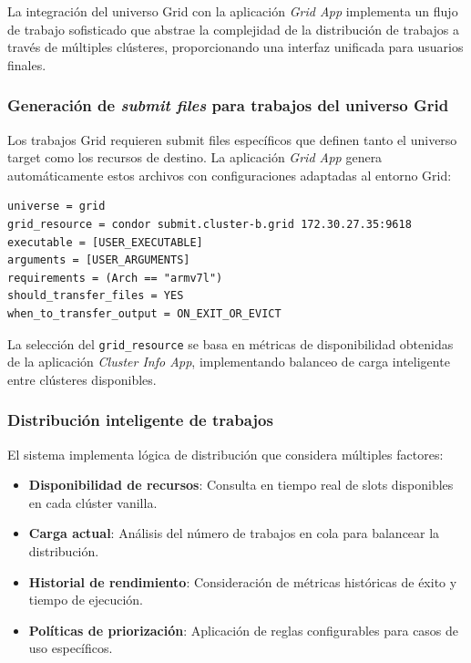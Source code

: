 La integración del universo Grid con la aplicación \textit{Grid App} implementa un flujo de trabajo sofisticado que abstrae la complejidad de la distribución de trabajos a través de múltiples clústeres, proporcionando una interfaz unificada para usuarios finales.

\subsubsection{Generación de \textit{submit files} para trabajos del universo Grid}
\noindent

Los trabajos Grid requieren submit files específicos que definen tanto el universo target como los recursos de destino. La aplicación \textit{Grid App} genera automáticamente estos archivos con configuraciones adaptadas al entorno Grid:

\begin{verbatim}
universe = grid
grid_resource = condor submit.cluster-b.grid 172.30.27.35:9618
executable = [USER_EXECUTABLE]
arguments = [USER_ARGUMENTS]
requirements = (Arch == "armv7l")
should_transfer_files = YES
when_to_transfer_output = ON_EXIT_OR_EVICT
\end{verbatim}

La selección del \texttt{grid\_resource} se basa en métricas de disponibilidad obtenidas de la aplicación \textit{Cluster Info App}, implementando balanceo de carga inteligente entre clústeres disponibles.

\subsubsection{Distribución inteligente de trabajos}
\noindent

El sistema implementa lógica de distribución que considera múltiples factores:

\begin{itemize}
	\item \textbf{Disponibilidad de recursos}: Consulta en tiempo real de slots disponibles en cada clúster vanilla.
	
	\item \textbf{Carga actual}: Análisis del número de trabajos en cola para balancear la distribución.
	
	\item \textbf{Historial de rendimiento}: Consideración de métricas históricas de éxito y tiempo de ejecución.
	
	\item \textbf{Políticas de priorización}: Aplicación de reglas configurables para casos de uso específicos.
\end{itemize}

